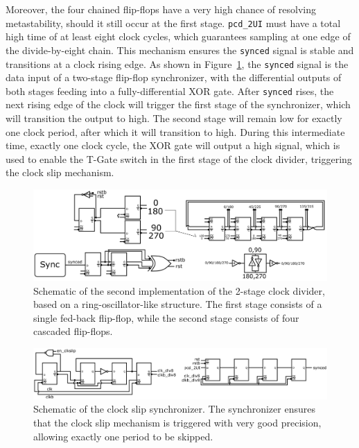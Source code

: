 Moreover, the four chained flip-flops have a very high chance of resolving metastability, should it still occur at the first stage. \texttt{pcd\_2UI} must have a total high time of at least eight clock cycles, which guarantees sampling at one edge of the divide-by-eight chain.
This mechanism ensures the \texttt{synced} signal is stable and transitions at a clock rising edge.
As shown in Figure~\ref{fig:div_V2_complete}, the \texttt{synced} signal is the data input of a two-stage flip-flop synchronizer, with the differential outputs of both stages feeding into a fully-differential XOR gate.
After \texttt{synced} rises, the next rising edge of the clock will trigger the first stage of the synchronizer, which will transition the output to high. The second stage will remain low for exactly one clock period, after which it will transition to high. During this intermediate time, exactly one clock cycle, the XOR gate will output a high signal, which is used to enable the T-Gate switch in the first stage of the clock divider, triggering the clock slip mechanism.
\begin{figure}[htbp]
  \centering
  \includegraphics[width=\linewidth]{figures/Schematics/div_V2_complete.png}
  \caption{Schematic of the second implementation of the 2-stage clock divider, based on a ring-oscillator-like structure. The first stage consists of a single fed-back flip-flop, while the second stage consists of four cascaded flip-flops.}
  \label{fig:div_V2_complete}
\end{figure}
\begin{figure}[htbp]
  \centering
  \includegraphics[width=\linewidth]{figures/Schematics/sync_complete.png}
  \caption{Schematic of the clock slip synchronizer. The synchronizer ensures that the clock slip mechanism is triggered with very good precision, allowing exactly one period to be skipped.}
  \label{fig:sync}
\end{figure}
